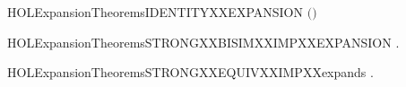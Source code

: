 \newcommand{\HOLExpansionTheoremsEXPANSIONXXWEAKXXTRANSYY}{\UseVerbatim{HOLExpansionTheoremsEXPANSIONXXWEAKXXTRANSYY}}
\begin{SaveVerbatim}{HOLExpansionTheoremsIDENTITYXXEXPANSION}
\HOLTokenTurnstile{}  \ensuremath{(}\HOLSymConst{\ensuremath{=}}\ensuremath{)}
\end{SaveVerbatim}
\newcommand{\HOLExpansionTheoremsIDENTITYXXEXPANSION}{\UseVerbatim{HOLExpansionTheoremsIDENTITYXXEXPANSION}}
\begin{SaveVerbatim}{HOLExpansionTheoremsSTRONGXXBISIMXXIMPXXEXPANSION}
\HOLTokenTurnstile{} \HOLSymConst{\HOLTokenForall{}}.   \HOLSymConst{\HOLTokenImp{}}  
\end{SaveVerbatim}
\newcommand{\HOLExpansionTheoremsSTRONGXXBISIMXXIMPXXEXPANSION}{\UseVerbatim{HOLExpansionTheoremsSTRONGXXBISIMXXIMPXXEXPANSION}}
\begin{SaveVerbatim}{HOLExpansionTheoremsSTRONGXXEQUIVXXIMPXXexpands}
\HOLTokenTurnstile{} \HOLSymConst{\HOLTokenForall{}} .    \HOLSymConst{\HOLTokenImp{}}   
\end{SaveVerbatim}
\newcommand{\HOLExpansionTheoremsSTRONGXXEQUIVXXIMPXXexpands}{\UseVerbatim{HOLExpansionTheoremsSTRONGXXEQUIVXXIMPXXexpands}}

